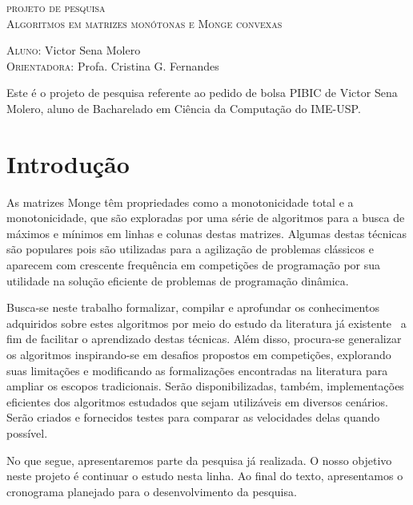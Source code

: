 \begin{center}
\LARGE{\scshape{projeto de pesquisa}} \\
\vspace{.5cm}
\large{\scshape{Algoritmos em matrizes monótonas e Monge convexas}} \\
\end{center}

\vspace{1cm}

\noindent
\textsc{Aluno:} Victor Sena Molero \\
\textsc{Orientadora:} Profa. Cristina G. Fernandes

\vspace{1cm}


Este é o projeto de pesquisa referente ao pedido de bolsa PIBIC de Victor Sena Molero, aluno de Bacharelado em Ciência da Computação do IME-USP.

\section{Introdução}

As matrizes Monge têm propriedades como a monotonicidade total e a monotonicidade, que são exploradas por uma série de algoritmos para a busca de máximos e mínimos em linhas e colunas destas matrizes. Algumas destas técnicas são populares pois são utilizadas para a agilização de problemas clássicos e aparecem com crescente frequência em competições de programação por sua utilidade na solução eficiente de problemas de programação dinâmica.

Busca-se neste trabalho formalizar, compilar e aprofundar os conhecimentos adquiridos sobre estes algoritmos por meio do estudo da literatura já existente~\cite{Galil:1992,Bein:2009} a fim de facilitar o aprendizado destas técnicas. Além disso, procura-se generalizar os algoritmos inspirando-se em desafios propostos em competições, explorando suas limitações e modificando as formalizações encontradas na literatura para ampliar os escopos tradicionais. Serão disponibilizadas, também, implementações eficientes dos algoritmos estudados que sejam utilizáveis em diversos cenários. Serão criados e fornecidos testes para comparar as velocidades delas quando possível.

No que segue, apresentaremos parte da pesquisa já realizada. O nosso objetivo neste projeto é continuar o estudo nesta linha. Ao final do texto, apresentamos o cronograma planejado para o desenvolvimento da pesquisa.
